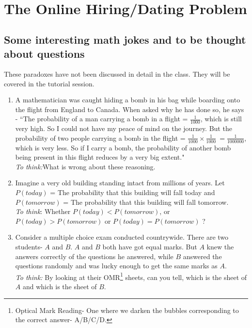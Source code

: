 \documentclass[11pt,fleqn]{book} %
\begin{document}
\chapter{The Online Hiring/Dating Problem}
\section{Some interesting math jokes and to be thought about questions}

{\footnotesize These paradoxes have not been discussed in detail in the class. They will be covered in the tutorial session.}

\begin{enumerate}

\item A mathematician was caught hiding a bomb in his bag while boarding onto the flight from England to Canada. When asked why he has done so, he says - ``The probability of a man carrying a bomb in a flight = $\frac{1}{1000}$, which is still very high. So I could not have my peace of mind on the journey. But the probability of two people carrying a bomb in the flight = $\frac{1}{1000} \times \frac{1}{1000}\ = \frac{1}{1000000}$, which is very less. So if I carry a bomb, the probability of another bomb being present in this flight reduces by a very big extent."\\
\textit{To think:}What is wrong about these reasoning. 

\item Imagine a very old building standing intact from millions of years. Let $P(today)$ = The probability that this building will fall today and $P(tomorrow)$ = The probability that this building will fall tomorrow. \\
\textit{To think}: Whether $P(today)<P(tomorrow)$, or $P(today)>P(tomorrow)$ or $P(today)=P(tomorrow)$ ?

\item Consider a multiple choice exam conducted countrywide. There are two students- $A$ and $B$. $A$ and $B$ both have got equal marks. But $A$ knew the answers correctly of the questions he answered, while $B$ answered the questions randomly and was lucky enough to get the same marks as $A$. \\
\textit{To think:} By looking at their OMR\footnote{Optical Mark Reading- One where we darken the bubbles corresponding to the correct answer- A/B/C/D.} sheets, can you tell, which is the sheet of $A$ and which is the sheet of $B$.

\end{enumerate}
\end{document}
